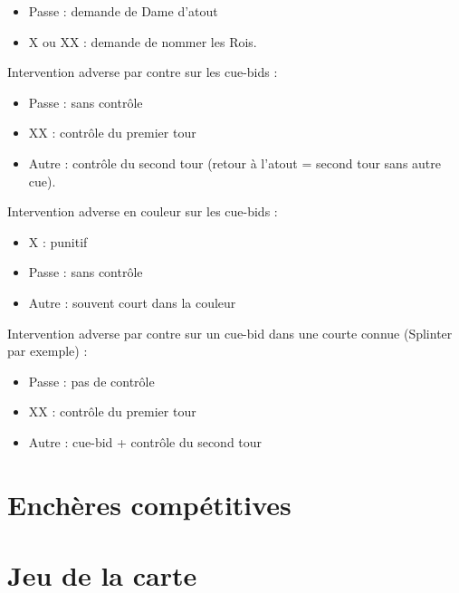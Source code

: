 \documentclass[a4paper]{article}
\begin{document}
\begin{itemize}
\item Passe : demande de Dame d'atout

\item X ou XX : demande de nommer les Rois.

\end{itemize}

Intervention adverse par contre sur les cue-bids :

\begin{itemize}
\item Passe : sans contrôle

\item XX : contrôle du premier tour

\item Autre : contrôle du second tour (retour à l'atout = second tour sans autre cue).

\end{itemize}

Intervention adverse en couleur sur les cue-bids :

\begin{itemize}
\item X : punitif

\item Passe : sans contrôle

\item Autre : souvent court dans la couleur

\end{itemize}

Intervention adverse par contre sur un cue-bid dans une courte connue (Splinter par exemple) :

\begin{itemize}
\item Passe : pas de contrôle

\item XX : contrôle du premier tour

\item Autre : cue-bid + contrôle du second tour

\end{itemize}

\section{Enchères compétitives}

\section{Jeu de la carte}
\end{document}
